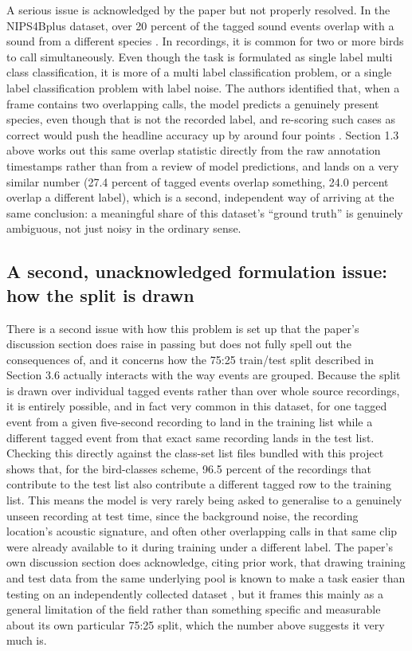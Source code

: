 \documentclass[11pt]{article}
\begin{document}
A serious issue is acknowledged by the paper but not properly resolved. In the NIPS4Bplus dataset, over 20 percent of the tagged sound events overlap with a sound from a different species \citep{bravosanchez2021}. In recordings, it is common for two or more birds to call simultaneously. Even though the task is formulated as single label multi class classification, it is more of a multi label classification problem, or a single label classification problem with label noise. The authors identified that, when a frame contains two overlapping calls, the model predicts a genuinely present species, even though that is not the recorded label, and re-scoring such cases as correct would push the headline accuracy up by around four points \citep{bravosanchez2021}. Section 1.3 above works out this same overlap statistic directly from the raw annotation timestamps rather than from a review of model predictions, and lands on a very similar number (27.4 percent of tagged events overlap something, 24.0 percent overlap a different label), which is a second, independent way of arriving at the same conclusion: a meaningful share of this dataset's ``ground truth'' is genuinely ambiguous, not just noisy in the ordinary sense.

\subsection{A second, unacknowledged formulation issue: how the split is drawn}

There is a second issue with how this problem is set up that the paper's discussion section does raise in passing but does not fully spell out the consequences of, and it concerns how the 75:25 train/test split described in Section 3.6 actually interacts with the way events are grouped. Because the split is drawn over individual tagged events rather than over whole source recordings, it is entirely possible, and in fact very common in this dataset, for one tagged event from a given five-second recording to land in the training list while a different tagged event from that exact same recording lands in the test list. Checking this directly against the class-set list files bundled with this project shows that, for the bird-classes scheme, 96.5 percent of the recordings that contribute to the test list also contribute a different tagged row to the training list. This means the model is very rarely being asked to generalise to a genuinely unseen recording at test time, since the background noise, the recording location's acoustic signature, and often other overlapping calls in that same clip were already available to it during training under a different label. The paper's own discussion section does acknowledge, citing prior work, that drawing training and test data from the same underlying pool is known to make a task easier than testing on an independently collected dataset \citep{xie2020}, but it frames this mainly as a general limitation of the field rather than something specific and measurable about its own particular 75:25 split, which the number above suggests it very much is.
\end{document}
